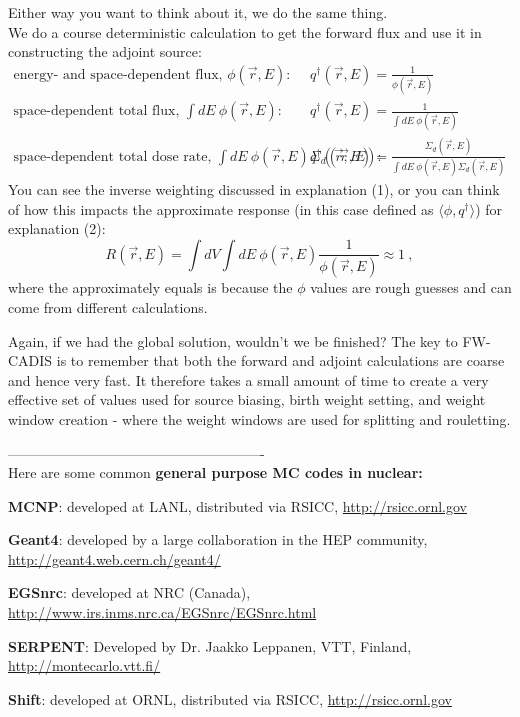 \documentclass[12pt]{article}
\begin{document}
\vspace*{1 em}
Either way you want to think about it, we do the same thing. \\
We do a course deterministic calculation to get the forward flux and use it in constructing the adjoint source:
\begin{align*}
\text{energy- and space-dependent flux, } \phi(\vec{r},E): \quad & q^{\dagger}(\vec{r},E) = \frac{1}{\phi(\vec{r},E)}\\
\text{space-dependent total flux, } \int dE\:\phi(\vec{r},E): \quad & q^{\dagger}(\vec{r},E) = \frac{1}{\int dE\:\phi(\vec{r},E)}\\
\text{space-dependent total dose rate, } \int dE\:\phi(\vec{r},E) \Sigma_d(\vec{r},E): \quad & q^{\dagger}(\vec{r},E) = \frac{\Sigma_d(\vec{r},E)}{\int dE\:\phi(\vec{r},E)\Sigma_d(\vec{r},E)}
\end{align*} 
You can see the inverse weighting discussed in explanation (1), or you can think of how this impacts the approximate response (in this case defined as $\langle \phi, q^{\dagger}\rangle$) for explanation (2):
\[
R(\vec{r},E) = \int dV \int dE \: \phi(\vec{r},E) \frac{1}{\phi(\vec{r},E)} \approx 1\:,
\]
where the approximately equals is because the $\phi$ values are rough guesses and can come from different calculations.

Again, if we had the global solution, wouldn't we be finished? The key to FW-CADIS is to remember that both the forward and adjoint calculations are coarse and hence very fast. It therefore takes a small amount of time to create a very effective set of values used for source biasing, birth weight setting, and weight window creation - where the weight windows are used for splitting and rouletting. 

-------------------------------------------------------\\
Here are some common \textbf{general purpose MC codes in nuclear:}
\begin{compactitem}
\item \textbf{MCNP}: developed at LANL, distributed via RSICC, \href{http://rsicc.ornl.gov}{http://rsicc.ornl.gov}
\item \textbf{Geant4}: developed by a large collaboration in the HEP community, \href{ http://geant4.web.cern.ch/geant4/}{http://geant4.web.cern.ch/geant4/}
\item \textbf{EGSnrc}: developed at NRC (Canada), \href{http://www.irs.inms.nrc.ca/EGSnrc/EGSnrc.html}{http://www.irs.inms.nrc.ca/EGSnrc/EGSnrc.html}
\item \textbf{SERPENT}: Developed by Dr. Jaakko Leppanen, VTT, Finland, \href{ http://montecarlo.vtt.fi/}{http://montecarlo.vtt.fi/}
\item \textbf{Shift}: developed at ORNL, distributed via RSICC, \href{http://rsicc.ornl.gov}{http://rsicc.ornl.gov}
\end{compactitem}
\end{document}
